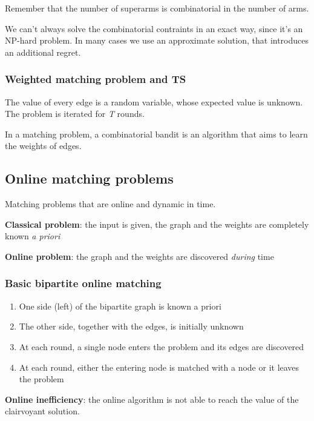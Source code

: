 \documentclass[10pt,a4paper]{article}
\begin{document}
Remember that the number of superarms is combinatorial in the number of arms.

We can't always solve the combinatorial contraints in an exact way, since it's an NP-hard problem. In many cases we use an approximate solution, that introduces an additional regret.

\subsubsection{Weighted matching problem and TS}\label{weighted-matching-problem-and-ts}

The value of every edge is a random variable, whose expected value is unknown. The problem is iterated for \textit{T} rounds.

In a matching problem, a combinatorial bandit is an algorithm that aims to learn the weights of edges.

\subsection{Online matching problems}\label{online-matching-problems}

Matching problems that are online and dynamic in time.

\textbf{Classical problem}: the input is given, the graph and the weights are completely known \textit{a priori}

\textbf{Online problem}: the graph and the weights are discovered \textit{during} time

\subsubsection{Basic bipartite online matching}\label{basic-bipartite-online-matching}

\begin{enumerate}

\item One side (left) of the bipartite graph is known a priori
\item The other side, together with the edges, is initially unknown
\item At each round, a single node enters the problem and its edges are discovered
\item At each round, either the entering node is matched with a node or it leaves the problem
\end{enumerate}

\textbf{Online inefficiency}: the online algorithm is not able to reach the value of the clairvoyant solution.
\end{document}
